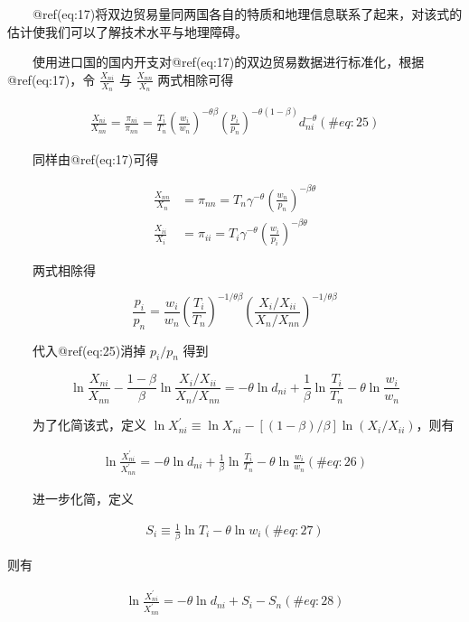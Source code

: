 \documentclass[]{tufte-handout}
\begin{document}
　　@ref(eq:17)将双边贸易量同两国各自的特质和地理信息联系了起来，对该式的估计使我们可以了解技术水平与地理障碍。

　　使用进口国的国内开支对@ref(eq:17)的双边贸易数据进行标准化，根据@ref(eq:17)，令
\(\frac{X_{ni}}{X_n}\) 与 \(\frac{X_{nn}}{X_n}\) 两式相除可得

\begin{align}
\frac{X_{n i}}{X_{n n}}=\frac{\pi_{n i}}{\pi_{n n}}=\frac{T_{i}}{T_{n}}\left(\frac{w_{i}}{w_{n}}\right)^{-\theta \beta}\left(\frac{p_{i}}{p_{n}}\right)^{-\theta(1-\beta)} d_{n i}^{-\theta} (\#eq:25)
\end{align}

　　同样由@ref(eq:17)可得

\[
\begin{aligned}
\frac{X_{n n}}{X_{n}}&=\pi_{n n}=T_{n}\gamma^{-\theta}\left(\frac{w_{n}}{p_{n}}\right)^{-\beta\theta } \\
\frac{X_{i i}}{X_{i}}&=\pi_{i i}=T_{i}\gamma^{-\theta}\left(\frac{w_{i}}{p_{i}}\right)^{-\beta\theta } 
\end{aligned}
\]

　　两式相除得

\[
\frac{p_{i}}{p_{n}}=\frac{w_{i}}{w_{n}}\left(\frac{T_{i}}{T_{n}}\right)^{-1 / \theta \beta}\left(\frac{X_{i} / X_{i i}}{X_{n} / X_{n n}}\right)^{-1 / \theta \beta}
\]

　　代入@ref(eq:25)消掉 \({p_i}/{p_n}\) 得到

\[
\ln \frac{X_{n i}}{X_{n n}}-\frac{1-\beta}{\beta}\ln \frac{X_{i} / X_{i i}}{X_{n} / X_{n n}}=-\theta \ln d_{n i}+\frac{1}{\beta} \ln \frac{T_{i}}{T_{n}}-\theta \ln \frac{w_{i}}{w_{n}}
\]

　　为了化简该式，定义
\(\ln X_{n i}^{\prime} \equiv \ln X_{ni}-[(1-\beta)/\beta] \ln (X_i/X_{ii})\)，则有

\begin{align}
\ln \frac{X_{n i}^{\prime}}{X_{n n}^{\prime}}=-\theta \ln d_{n i}+\frac{1}{\beta} \ln \frac{T_{i}}{T_{n}}-\theta \ln \frac{w_{i}}{w_{n}} (\#eq:26)
\end{align}

　　进一步化简，定义

\begin{align}
S_i \equiv \frac{1}{\beta} \ln T_i - \theta \ln w_i (\#eq:27)
\end{align}

则有

\begin{align}
\ln \frac{X_{n i}^{\prime}}{X_{n n}^{\prime}}=-\theta \ln d_{n i}+S_i-S_n (\#eq:28)
\end{align}
\end{document}
